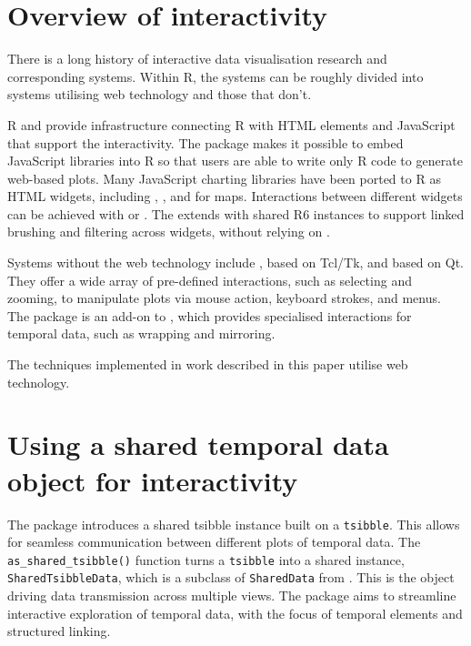 \hypertarget{overview-of-interactivity}{%
\section{Overview of interactivity}\label{overview-of-interactivity}}

There is a long history of interactive data visualisation research and
corresponding systems. Within R, the systems can be roughly divided into
systems utilising web technology and those that don't.

R  \citep{R-shiny} and 
\citep{R-htmlwidgets} provide infrastructure connecting R with HTML
elements and JavaScript that support the interactivity. The
 package makes it possible to embed JavaScript
libraries into R so that users are able to write only R code to generate
web-based plots. Many JavaScript charting libraries have been ported to
R as HTML widgets, including  \citep{plotly2020},
 \citep{R-rbokeh}, and 
\citep{R-leaflet} for maps. Interactions between different widgets can
be achieved with  or 
\citep{R-crosstalk}. The  extends
 with shared R6 instances to support linked
brushing and filtering across widgets, without relying on
.

Systems without the web technology include 
\citep{R-loon}, based on Tcl/Tk, and 
\citep{xie_reactive_2014} based on Qt. They offer a wide array of
pre-defined interactions, such as selecting and zooming, to manipulate
plots via mouse action, keyboard strokes, and menus. The
 package \citep{cheng_enabling_2016} is an add-on to
, which provides specialised interactions for temporal
data, such as wrapping and mirroring.

The techniques implemented in work described in this paper utilise web
technology.

\hypertarget{using-a-shared-temporal-data-object-for-interactivity}{%
\section{Using a shared temporal data object for
interactivity}\label{using-a-shared-temporal-data-object-for-interactivity}}

The  package introduces a shared tsibble instance
built on a \texttt{tsibble}. This allows for seamless communication
between different plots of temporal data. The
\texttt{as\_shared\_tsibble()} function turns a \texttt{tsibble} into a
shared instance, \texttt{SharedTsibbleData}, which is a subclass of
\texttt{SharedData} from . This is the object driving
data transmission across multiple views. The 
package aims to streamline interactive exploration of temporal data,
with the focus of temporal elements and structured linking.

